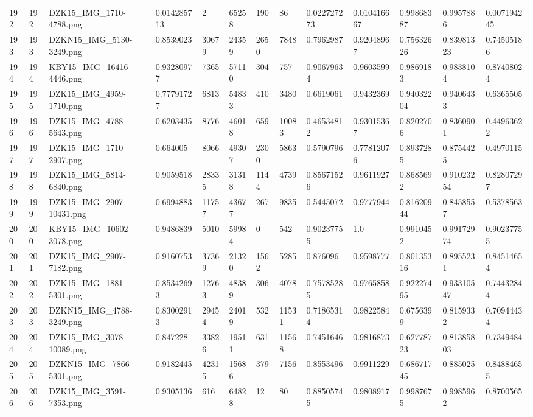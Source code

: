 \documentclass[11pt, a4paper, twoside]{report}
\begin{document}
\begin{longtable}[c]{@{}lllllllllllll@{}}
192 & 192 & DZK15\_IMG\_1710-4788.png & 0.014285713 & 2 & 65258 & 190 & 86 & 0.022727273 & 0.010416667 & 0.99868387 & 0.9957886 & 0.007194245 \\
193 & 193 & DZKN15\_IMG\_5130-3249.png & 0.8539023 & 30679 & 24359 & 2650 & 7848 & 0.7962987 & 0.92048967 & 0.75632626 & 0.83981323 & 0.74505186 \\
194 & 194 & KBY15\_IMG\_16416-4446.png & 0.93280977 & 7365 & 57110 & 304 & 757 & 0.90679634 & 0.9603599 & 0.9869183 & 0.9838104 & 0.87408024 \\
195 & 195 & DZK15\_IMG\_4959-1710.png & 0.77791727 & 6813 & 54833 & 410 & 3480 & 0.6619061 & 0.9432369 & 0.94032204 & 0.9406433 & 0.6365505 \\
196 & 196 & DZK15\_IMG\_4788-5643.png & 0.6203435 & 8776 & 46018 & 659 & 10083 & 0.46534812 & 0.93015367 & 0.8202706 & 0.8360901 & 0.44963622 \\
197 & 197 & DZK15\_IMG\_1710-2907.png & 0.664005 & 8066 & 49307 & 2300 & 5863 & 0.5790796 & 0.77812076 & 0.8937285 & 0.8754425 & 0.4970115 \\
198 & 198 & DZK15\_IMG\_5814-6840.png & 0.9059518 & 28335 & 31318 & 1144 & 4739 & 0.85671526 & 0.9611927 & 0.8685692 & 0.91023254 & 0.82807297 \\
199 & 199 & DZK15\_IMG\_2907-10431.png & 0.6994883 & 11757 & 43677 & 267 & 9835 & 0.5445072 & 0.9777944 & 0.81620944 & 0.8458557 & 0.5378563 \\
200 & 200 & KBY15\_IMG\_10602-3078.png & 0.9486839 & 5010 & 59984 & 0 & 542 & 0.90237755 & 1.0 & 0.9910452 & 0.99172974 & 0.90237755 \\
201 & 201 & DZK15\_IMG\_2907-7182.png & 0.9160753 & 37369 & 21320 & 1562 & 5285 & 0.876096 & 0.9598777 & 0.80135316 & 0.8955231 & 0.84514654 \\
202 & 202 & DZK15\_IMG\_1881-5301.png & 0.85342693 & 12763 & 48389 & 306 & 4078 & 0.75785285 & 0.9765858 & 0.92227495 & 0.93310547 & 0.74432844 \\
203 & 203 & DZKN15\_IMG\_4788-3249.png & 0.83002913 & 29454 & 24019 & 532 & 11531 & 0.71865314 & 0.9822584 & 0.6756399 & 0.8159332 & 0.70944434 \\
204 & 204 & DZK15\_IMG\_3078-10089.png & 0.847228 & 33826 & 19511 & 631 & 11568 & 0.7451646 & 0.9816873 & 0.62778723 & 0.81385803 & 0.7349484 \\
205 & 205 & DZKN15\_IMG\_7866-5301.png & 0.9182445 & 42315 & 15686 & 379 & 7156 & 0.8553496 & 0.9911229 & 0.68671745 & 0.885025 & 0.84884655 \\
206 & 206 & DZK15\_IMG\_3591-7353.png & 0.9305136 & 616 & 64828 & 12 & 80 & 0.88505745 & 0.9808917 & 0.9987675 & 0.9985962 & 0.8700565 \\

\end{longtable}
\end{document}
